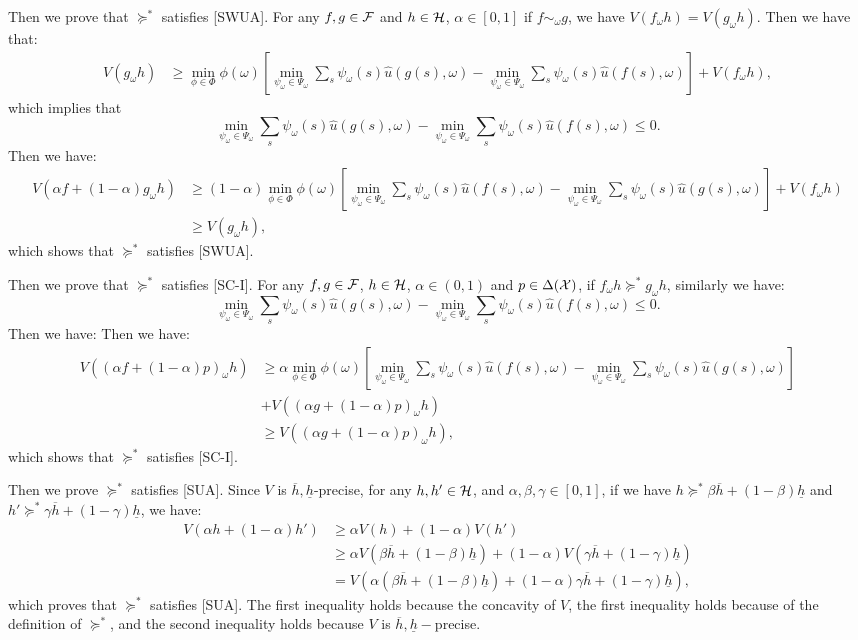 \documentclass[11pt,oneside]{article}
\theoremstyle{plain}
\theoremstyle{plain}
\theoremstyle{plain}
\theoremstyle{plain}
\theoremstyle{plain}
\theoremstyle{definition}
\theoremstyle{definition}
\theoremstyle{remark}
\theoremstyle{plain}
\newcommand{\F}{{\cal F}}
\newcommand{\ulh}{\underline{h}}
\newcommand{\olh}{\overline{h}}
\newcommand{\mcx}{{\cal X}}
\newcommand{\pfs}{\succeq^*}
\newcommand{\convmix}[2]{\alpha #1 + (1-\alpha) #2}
\newcommand{\convexmix}[3]{#3 #1 + (1-#3) #2}
\newcommand{\omix}[2]{#1_\omega #2 }
\begin{document}
Then we prove that $\pfs$ satisfies [SWUA]. For any $f,g \in \F$ and $h \in {\cal H}$, $\alpha \in [0,1]$ if $f \sim_\omega g$, we have $V(\omix{f}{h}) = V(\omix{g}{h})$. Then we have that:
\begin{align*}
V(\omix{g}{h}) & \geq \min_{\phi \in \Phi} \phi(\omega) \left[  \min_{\psi_\omega \in \Psi_\omega} \sum_s \psi_\omega(s) \hat{u} \left(g(s),\omega\right) - \min_{\psi_\omega \in \Psi_\omega} \sum_s \psi_\omega(s) \hat{u} \left(f(s),\omega\right) \right] + V(\omix{f}{h}),
\end{align*}
which implies that $$\min_{\psi_\omega \in \Psi_\omega} \sum_s \psi_\omega(s) \hat{u} \left(g(s),\omega\right) - \min_{\psi_\omega \in \Psi_\omega} \sum_s \psi_\omega(s) \hat{u} \left(f(s),\omega\right) \leq 0.$$ Then we have:
\begin{align*}
V(\omix{\convmix{f}{g}}{h}) & \geq (1-\alpha)\min_{\phi \in \Phi} \phi(\omega) \left[  \min_{\psi_\omega \in \Psi_\omega} \sum_s \psi_\omega(s) \hat{u} \left(f(s),\omega\right) - \min_{\psi_\omega \in \Psi_\omega} \sum_s \psi_\omega(s) \hat{u} \left(g(s),\omega\right) \right] + V(\omix{f}{h}) \\
& \geq V(\omix{g}{h}),  
\end{align*}
which shows that $\pfs$ satisfies [SWUA].

Then we prove that $\pfs$ satisfies [SC-I]. For any $f,g \in \F$, $h \in {\cal H}$, $\alpha \in (0,1)$ and $p \in \Delta(\mcx)$, if $\omix{f}{h} \pfs \omix{g}{h}$, similarly we have:
$$\min_{\psi_\omega \in \Psi_\omega} \sum_s \psi_\omega(s) \hat{u} \left(g(s),\omega\right) - \min_{\psi_\omega \in \Psi_\omega} \sum_s \psi_\omega(s) \hat{u} \left(f(s),\omega\right) \leq 0.$$ Then we have:
Then we have:
\begin{align*}
V(\omix{(\convmix{f}{p})}{h}) & \geq \alpha \min_{\phi \in \Phi} \phi(\omega) \left[  \min_{\psi_\omega \in \Psi_\omega} \sum_s \psi_\omega(s) \hat{u} \left(f(s),\omega\right) - \min_{\psi_\omega \in \Psi_\omega} \sum_s \psi_\omega(s) \hat{u} \left(g(s),\omega\right) \right]\\
& + V(\omix{(\convmix{g}{p})}{h}) \\
& \geq V(\omix{(\convmix{g}{p})}{h}),
\end{align*}
which shows that $\pfs$ satisfies [SC-I].

Then we prove $\pfs$ satisfies [SUA]. Since $V$ is $\olh,\ulh$-precise, for any $h,h' \in {\cal H}$, and $\alpha,\beta,\gamma \in [0,1]$, if we have 
$h\pfs \convexmix{\olh}{\ulh}{\beta}$ and $h' \pfs \convexmix{\olh}{\ulh}{\gamma}$, we have:
\begin{align*}
V(\convexmix{h}{h'}{\alpha}) & \geq \alpha V(h) + (1-\alpha)V(h') \\
& \geq \alpha V(\convexmix{\olh}{\ulh}{\beta}) + (1-\alpha)V(\convexmix{\olh}{\ulh}{\gamma}) \\
& = V\left(\convexmix{(\convexmix{\olh}{\ulh}{\beta})}{\convexmix{\olh}{\ulh}{\gamma}}{\alpha}\right),
\end{align*}
which proves that $\pfs$ satisfies [SUA]. The first inequality holds because the concavity of $V$, the first inequality holds because of the definition of $\pfs$, and 
the second inequality holds because $V$ is $\olh,\ulh-$precise.
\end{document}
